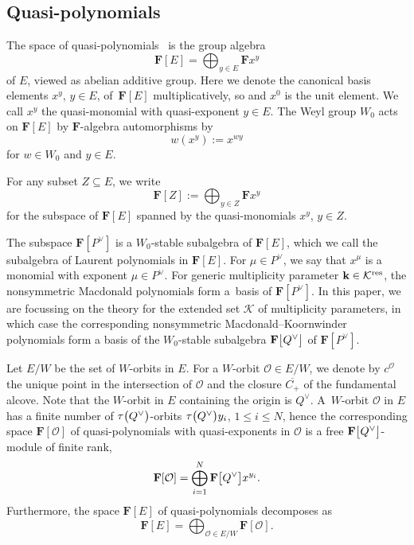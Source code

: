 \documentclass[11pt]{article}
\numberwithin{equation}{section}
\numberwithin{equation}{section}
\begin{document}
\subsection{Quasi-polynomials}%
The space of quasi-polynomials~\cite{SSV2} is the group algebra
\[
\mathbf{F}[E]=\bigoplus_{y\in E}\mathbf{F}x^y
\]
of $E$, viewed as abelian additive group. Here we denote the canonical basis elements $x^y$, ${y\in E}$, of~$\mathbf{F}[E]$ multiplicatively, so  and $x^0$ is the unit element. We call $x^y$ the quasi-monomial with quasi-exponent $y\in E$. The Weyl group $W_0$ acts on $\mathbf{F}[E]$
by $\mathbf{F}$-algebra automorphisms by
\[
w(x^y):=x^{wy}
\]
for $w\in W_0$ and $y\in E$.

For any subset $Z\subseteq E$, we write
\[
\mathbf{F}[Z]:=\bigoplus_{y\in Z}\mathbf{F}x^y
\]
for the subspace of $\mathbf{F}[E]$ spanned by the quasi-monomials $x^y$, $y\in Z$.

The subspace $\mathbf{F}[P^\vee]$ is a $W_0$-stable subalgebra of $\mathbf{F}[E]$, which we call the subalgebra of Laurent polynomials in $\mathbf{F}[E]$. For $\mu\in P^\vee$, we say that $x^\mu$ is a monomial with exponent $\mu\in P^\vee$.
For generic multiplicity parameter $\mathbf{k}\in\mathcal{K}^{{\rm res}}$, the nonsymmetric Macdonald polynomials form a~basis of $\mathbf{F}[P^\vee]$.
In this paper, we are focussing on the theory for the extended set $\mathcal{K}$ of multiplicity parameters, in which case the corresponding nonsymmetric Macdonald--Koornwinder polynomials form a basis of the $W_0$-stable subalgebra $\mathbf{F}\smash{\bigl[Q^\vee\bigr]}$ of $\mathbf{F}[P^\vee]$.

Let $E/W$ be the set of $W$-orbits in $E$. For a $W$-orbit $\mathcal{O}\in E/W$, we denote by $c^{\mathcal{O}}$ the unique point in the intersection of $\mathcal{O}$
and the closure $\overline{C_+}$ of the fundamental alcove. Note that the $W$-orbit in $E$ containing the origin is $Q^\vee$.
A~$W$-orbit $\mathcal{O}$ in $E$ has a finite number of $\tau\smash{\bigl(Q^\vee\bigr)}$-orbits $\tau\smash{\bigl(Q^\vee\bigr)}y_i$, $1\leq i\leq N$, hence the corresponding space $\mathbf{F}[\mathcal{O}]$ of quasi-polynomials with quasi-exponents in $\mathcal{O}$ is a free $\mathbf{F}\smash{\bigl[Q^\vee\bigr]}$-module of finite rank,
\begin{equation}\label{FOpoldec}
\mathbf{F}[\mathcal{O}]=\bigoplus_{i=1}^N\mathbf{F}\smash{\bigl[Q^\vee\bigr]}x^{y_i}.
\end{equation}
Furthermore, the
space $\mathbf{F}[E]$ of quasi-polynomials decomposes as
\begin{equation}\label{Porbit}
\mathbf{F}[E]=\bigoplus_{\mathcal{O}\in E/W}\mathbf{F}[\mathcal{O}].
\end{equation}
\end{document}
